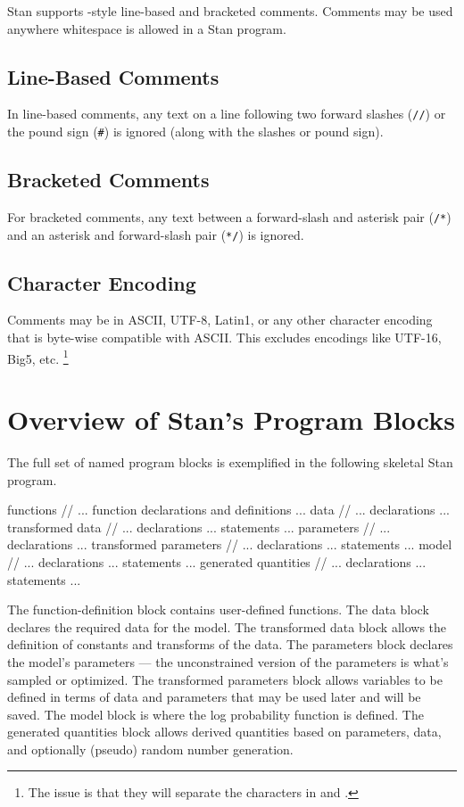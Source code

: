 Stan supports \Cpp-style line-based and bracketed comments.  Comments
may be used anywhere whitespace is allowed in a Stan program.

\subsection{Line-Based Comments}

In line-based comments, any text on a line following
two forward slashes (\Verb|//|) or the pound sign (\Verb|#|)
is ignored (along with the slashes or pound sign).

\subsection{Bracketed Comments}

For bracketed comments, any text between a forward-slash and asterisk
pair (\Verb|/*|) and an asterisk and forward-slash pair (\Verb|*/|) is
ignored.

\subsection{Character Encoding}

Comments may be in ASCII, UTF-8, Latin1, or any other character
encoding that is byte-wise compatible with ASCII.  This excludes
encodings like UTF-16, Big5, etc.%
%
\footnote{The issue is that they will separate the characters in
  \code{*/} and \code{*/}.}


\section{Overview of Stan's Program Blocks}

The full set of named program blocks is exemplified in the following
skeletal Stan program.
%
\begin{stancode}
functions {
  // ... function declarations and definitions ...
}
data {
  // ... declarations ...
}
transformed data {
   // ... declarations ... statements ...
}
parameters {
   // ... declarations ...
}
transformed parameters {
   // ... declarations ... statements ...
}
model {
   // ... declarations ... statements ...
}
generated quantities {
   // ... declarations ... statements ...
}
\end{stancode}
%
The function-definition block contains user-defined functions.  The
data block declares the required data for the model.  The transformed
data block allows the definition of constants and transforms of the
data.  The parameters block declares the model's parameters --- the
unconstrained version of the parameters is what's sampled or
optimized.  The transformed parameters block allows variables to be
defined in terms of data and parameters that may be used later and
will be saved.  The model block is where the log probability function
is defined.  The generated quantities block allows derived quantities
based on parameters, data, and optionally (pseudo) random number
generation.


